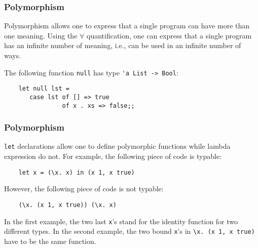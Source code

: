 \documentclass[12pt,red]{beamer}
\begin{document}
\begin{frame}[fragile]
  \frametitle{Polymorphism}

  Polymorphism allows one to express that a single program can have
  more than one meaning.  Using the $\forall$ quantification, one can
  express that a single program has an infinite number of meaning,
  i.e., can be used in an infinite number of ways.

  \vspace{0.2in}

  The following function \lstinline{null} has type \lstinline{'a List -> Bool}:
  \begin{beamerboxesrounded}[shadow=true]{}
    \begin{center}
    \begin{lstlisting}
    let null lst =
       case lst of [] => true
                of x . xs => false;;
    \end{lstlisting}
    \end{center}
  \end{beamerboxesrounded}
\end{frame}


\begin{frame}[fragile]
  \frametitle{Polymorphism}

  \lstinline{let} declarations allow one to define polymorphic
  functions while lambda expression do not.  For example, the
  following piece of code is typable:
  \begin{beamerboxesrounded}[shadow=true]{}
    \begin{center}
    \begin{lstlisting}
    let x = (\x. x) in (x 1, x true)
    \end{lstlisting}
    \end{center}
  \end{beamerboxesrounded}

  \vspace{0.1in}

  However, the following piece of code is not typable:
  \begin{beamerboxesrounded}[shadow=true]{}
    \begin{center}
    \begin{lstlisting}
    (\x. (x 1, x true)) (\x. x)
    \end{lstlisting}
    \end{center}
  \end{beamerboxesrounded}

  \vspace{0.1in}

  In the first example, the two last \lstinline{x}'s stand for the
  identity function for two different types.  In the second example,
  the two bound \lstinline{x}'s in \lstinline{\x. (x 1, x true)} have
  to be the same function.
\end{frame}
\end{document}
